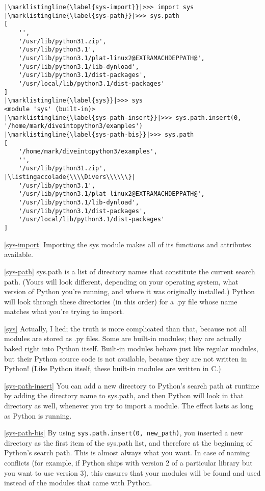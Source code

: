 \documentclass{article}
\makeatletter
\def\circledarabic#1{\expandafter\@circledarabic\csname c@#1\endcsname}
\def\@circledarabic#1{%
			\ifcase#1\or \ding{172}\or \ding{173}\or \ding{174}\or \ding{175}\or \ding{176}\or \ding{177}\or \ding{178}\or \ding{179}\or \ding{180}\or \ding{181}\else\@ctrerr\fi%
		}
\newcounter{listingnote}
\renewcommand{\thelistingnote}{\circledarabic{listingnote}}
\newcommand{\marklistingline}[1]{%
		\refstepcounter{listingnote}#1%
		\hbox to 0pt{\hspace*{\linewidth}\thelistingnote}%
	}
\newcommand{\listingaccolade}[1]{%
		\hbox to 0pt{\vbox to 0pt{\vskip-0.75em$\left\}\normalfont\begin{tabular}{@{}l@{}}#1\end{tabular}\right.$\vss}}%
	}
\makeatother
\begin{document}
\begin{lstlisting}[escapechar=|]
|\marklistingline{\label{sys-import}}|>>> import sys
|\marklistingline{\label{sys-path}}|>>> sys.path
[
    '',
    '/usr/lib/python31.zip',
    '/usr/lib/python3.1',
    '/usr/lib/python3.1/plat-linux2@EXTRAMACHDEPPATH@',
    '/usr/lib/python3.1/lib-dynload',
    '/usr/lib/python3.1/dist-packages',
    '/usr/local/lib/python3.1/dist-packages'
]
|\marklistingline{\label{sys}}|>>> sys
<module 'sys' (built-in)>
|\marklistingline{\label{sys-path-insert}}|>>> sys.path.insert(0, '/home/mark/diveintopython3/examples')
|\marklistingline{\label{sys-path-bis}}|>>> sys.path
[
    '/home/mark/diveintopython3/examples',
    '',
    '/usr/lib/python31.zip',                            |\listingaccolade{\\\\Divers\\\\\\}|
    '/usr/lib/python3.1',
    '/usr/lib/python3.1/plat-linux2@EXTRAMACHDEPPATH@',
    '/usr/lib/python3.1/lib-dynload',
    '/usr/lib/python3.1/dist-packages',
    '/usr/local/lib/python3.1/dist-packages'
]
\end{lstlisting}

\ref{sys-import} Importing the sys module makes all of its functions and attributes available.

\ref{sys-path} sys.path is a list of directory names that constitute the current search path. 
(Yours will look different, depending on your operating system, what version of Python you’re running,
and where it was originally installed.) Python will look through these directories (in this order) 
for a .py file whose name matches what you’re trying to import.

\ref{sys} Actually, I lied; the truth is more complicated than that, because not all modules are stored
as .py files. Some are built-in modules; they are actually baked right into Python itself. Built-in
modules behave just like regular modules, but their Python source code is not available, because
they are not written in Python! (Like Python itself, these built-in modules are written in C.)

\ref{sys-path-insert} You can add a new directory to Python’s search path at runtime by adding
the directory name to sys.path, and then Python will look in that directory as well, whenever
you try to import a module. The effect lasts as long as Python is running.

\ref{sys-path-bis} By using \lstinline|sys.path.insert(0, new_path)|, you inserted a new directory
as the first item of the sys.path list, and therefore at the beginning of Python’s search path.
This is almost always what you want. In case of naming conflicts (for example, if Python ships with
version 2 of a particular library but you want to use version 3), this ensures that your modules
will be found and used instead of the modules that came with Python.
\end{document}
